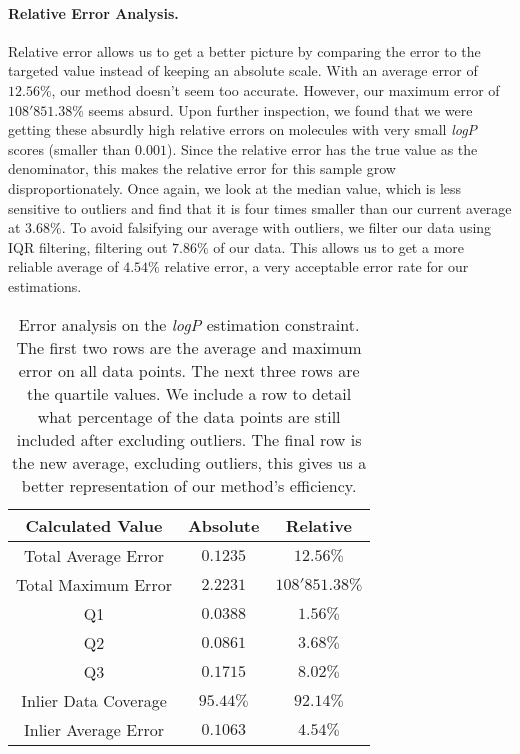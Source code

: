 \documentclass[../Document.tex]{subfiles}
\begin{document}
\paragraph{Relative Error Analysis.} Relative error allows us to get a better picture by comparing the error to the targeted value instead of keeping an absolute scale. 
With an average error of $12.56\%$, our method doesn't seem too accurate.
However, our maximum error of $108'851.38\%$ seems absurd.
Upon further inspection, we found that we were getting these absurdly high relative errors on molecules with very small \emph{logP} scores (\ie smaller than $0.001$).
Since the relative error has the true value as the denominator, this makes the relative error for this sample grow disproportionately.
Once again, we look at the median value, which is less sensitive to outliers and find that it is four times smaller than our current average at $3.68\%$.
To avoid falsifying our average with outliers, we filter our data using IQR filtering, filtering out $7.86\%$ of our data.
This allows us to get a more reliable average of $4.54\%$ relative error, a very acceptable error rate for our estimations.

\begin{table}[H]
    \centering
    \begin{tabular}{|c|c|c|}
        \hline
        Calculated Value & Absolute & Relative\\
        \hline
        Total Average Error & $0.1235$ & $12.56\%$\\
        \hline
        Total Maximum Error & $2.2231$ & $108'851.38\%$\\
        \hline
        Q1 & $0.0388$ & $1.56\%$\\
        \hline
        Q2 & $0.0861$ & $3.68\%$\\
        \hline
        Q3 & $0.1715$ & $8.02\%$\\
        \hline
        Inlier Data Coverage & $95.44\%$ & $92.14\%$\\
        \hline
        Inlier Average Error & $0.1063$ & $4.54\%$\\
        \hline
    \end{tabular}
    \caption[Error analysis on the \emph{logP} estimation constraint]{Error analysis on the \emph{logP} estimation constraint. The first two rows are the average and maximum error on all data points. The next three rows are the quartile values. We include a row to detail what percentage of the data points are still included after excluding outliers. The final row is the new average, excluding outliers, this gives us a better representation of our method's efficiency.}
    \label{tab:lingo-error-analysis}
\end{table}
\end{document}
